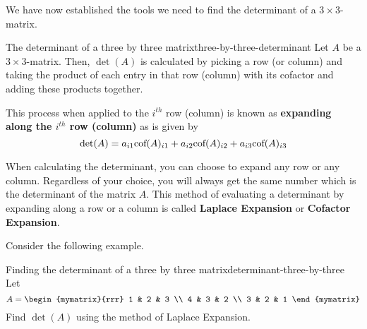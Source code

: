 We have now established the tools we need to find the determinant of a
$3\times3$-matrix.

\begin{definition}{The determinant of a three by three matrix}{three-by-three-determinant}
  Let $A$ be a $3\times 3$-matrix. Then, $\det(A)$ is calculated by
  picking a row (or column) and taking the product of each entry in
  that row (column) with its cofactor and adding these products
  together.

  This process when applied to the $i^{th}$ row (column) is known as
  \textbf{expanding along the $i^{th}$ row (column)}%
   as is given by
  \[
    \det(A) =
    a_{i1}\mbox{\rm cof}(A)_{i1} + a_{i2}\mbox{\rm cof}(A)_{i2} + a_{i3}\mbox{\rm cof}(A)_{i3}
  \]
\end{definition}

When calculating the determinant, you can choose to expand any row or
any column. Regardless of your choice, you will always get the same
number which is the determinant of the matrix $A$.  This method of
evaluating a determinant by expanding along a row or a column is
called \textbf{Laplace Expansion} or
\textbf{Cofactor Expansion}.

Consider the following example.

\begin{example}{Finding the determinant of a three by three matrix}{determinant-three-by-three}
  Let
  \begin{equation*}
    A=\begin{mymatrix}{rrr}
      1 & 2 & 3 \\
      4 & 3 & 2 \\
      3 & 2 & 1
    \end{mymatrix} 
  \end{equation*}
  Find $\det(A)$ using the method of Laplace Expansion.
\end{example}

